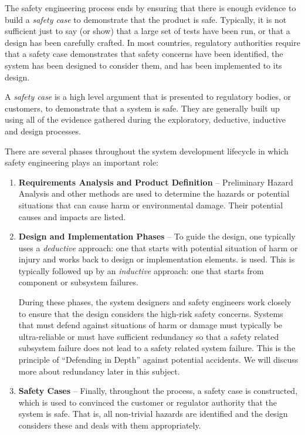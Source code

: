 The safety engineering process ends by ensuring that there is enough evidence to build a \emph{safety case} to demonstrate that the product is safe. Typically, it is not sufficient just to say (or show) that a large set of tests have been run, or that a design has been carefully crafted. In most countries, regulatory authorities require that a safety case demonstrates that safety concerns have been identified, the system has been designed to consider them, and has been implemented to its design.

\begin{definition}
A \emph{safety case} is a high level argument that is presented to regulatory bodies, or customers, to demonstrate that a system is safe. They are generally built up using all of the evidence gathered during the exploratory, deductive, inductive and design processes.
\end{definition}

There are several phases throughout the system development lifecycle in which safety engineering plays an important role:

\begin{enumerate}

\item {\bf Requirements Analysis and Product Definition} --
  Preliminary Hazard Analysis and other methods are used to determine
  the hazards or potential situations that can cause harm or
  environmental damage. Their potential causes and impacts are listed.

\item {\bf Design and Implementation Phases} -- To guide the design, one typically uses a
  \emph{deductive} approach: one that starts with potential situation of
  harm or injury and works back to design or implementation elements.
  is used. This is typically followed up by an \emph{inductive} approach:
  one that starts from component or subsystem failures.

  During these phases, the system designers and safety engineers work closely to ensure that the design considers the high-risk safety concerns. Systems that must defend against  situations of harm or damage must typically be ultra-reliable or must have sufficient redundancy so that a safety related
  subsystem failure does not lead to a safety related system
  failure. This is the principle of ``Defending in Depth'' against
  potential accidents. We will discuss more about redundancy later in this subject.


\item {\bf Safety Cases} -- Finally, throughout the process, a safety case is constructed, which is used to convinced the customer or regulator authority that the system is safe. That is, all non-trivial hazards are identified and  the design considers these and deals with them appropriately.

\end{enumerate}


